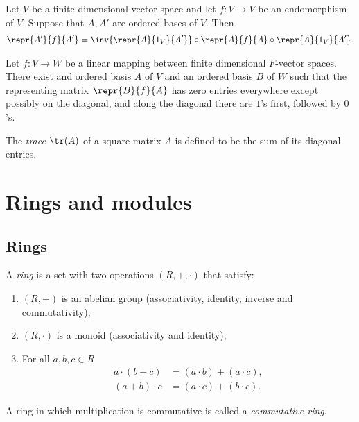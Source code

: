 \documentclass{article}
\begin{document}
\begin{corollary}[Notes 2.4.4]
    Let $V$ be a finite dimensional vector space and let $f:V\to V$ be an endomorphism of $V$.
    Suppose that $A,A'$ are ordered bases of $V$. Then 
    \begin{align*}
        \repr{A'}{f}{A'}=\inv{\repr{A}{1_V}{A'}}\circ\repr{A}{f}{A}\circ\repr{A}{1_V}{A'}.
    \end{align*} 
\end{corollary}

\begin{theorem}[Notes 2.4.5]
    Let $f:V\to W$ be a linear mapping between finite dimensional $F$-vector spaces. There exist
    and ordered basis $A$ of $V$ and an ordered basis $B$ of $W$ such that the representing matrix
    $\repr{B}{f}{A}$ has zero entries everywhere except possibly on the diagonal, and along the 
    diagonal there are $1$'s first, followed by $0$'s.
\end{theorem}

\begin{definition}
    The \emph{trace} $\tr(A)$ of a square matrix $A$ is defined to be the sum of its diagonal entries.
\end{definition}

\section{Rings and modules}

\subsection{Rings}

\begin{definition}
    A \emph{ring} is a set with two operations $(R,+,\cdot)$ that satisfy: 
    \begin{enumerate}
        \item $(R,+)$ is an abelian group (associativity, identity, inverse and commutativity);
        \item $(R,\cdot)$ is a monoid (associativity and identity);
        \item For all $a,b,c\in R$ \begin{align*}
            a\cdot (b+c) & = (a\cdot b) + (a\cdot c),\\
            (a+b)\cdot c & = (a\cdot c) + (b\cdot c).
        \end{align*}
    \end{enumerate}
    A ring in which multiplication is commutative is called a \emph{commutative ring}.
\end{definition}
\end{document}
